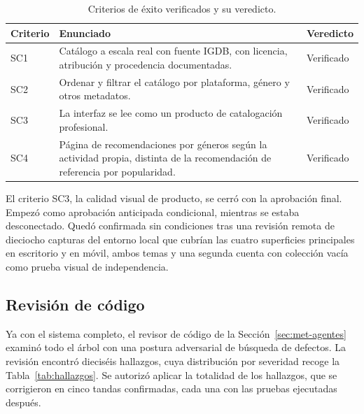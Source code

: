 \begin{table}[htp]
\centering
\begin{tabularx}{\textwidth}{ | C{0.12\textwidth} | Y | C{0.19\textwidth} | }
    \hline
    \textbf{Criterio} & \textbf{Enunciado} & \textbf{Veredicto} \\
    \hline
    SC1 & Catálogo a escala real con fuente IGDB, con licencia, atribución y procedencia documentadas. & Verificado \\
    \hline
    SC2 & Ordenar y filtrar el catálogo por plataforma, género y otros metadatos. & Verificado \\
    \hline
    SC3 & La interfaz se lee como un producto de catalogación profesional. & Verificado \\
    \hline
    SC4 & Página de recomendaciones por géneros según la actividad propia, distinta de la recomendación de referencia por popularidad. & Verificado \\
    \hline
\end{tabularx}
\caption{Criterios de éxito verificados y su veredicto.}
\label{tab:criterios}
\end{table}

El criterio SC3, la calidad visual de producto, se cerró con la aprobación final. Empezó
como aprobación anticipada condicional, mientras se estaba desconectado. Quedó
confirmada sin condiciones tras una revisión remota de dieciocho capturas del entorno local
que cubrían las cuatro superficies principales en escritorio y en móvil, ambos temas y una
segunda cuenta con colección vacía como prueba visual de independencia.

\subsection{Revisión de código}\label{sec:pru-revision}\label{sec:pru-post-cierre}\label{sec:pru-lectura}

Ya con el sistema completo, el revisor de código de la Sección~\ref{sec:met-agentes} examinó
todo el árbol con una postura adversarial de búsqueda de defectos.
La revisión encontró dieciséis hallazgos, cuya distribución por severidad recoge la
Tabla~\ref{tab:hallazgos}. Se autorizó aplicar la totalidad de los hallazgos, que se
corrigieron en cinco tandas confirmadas, cada una con las pruebas ejecutadas después.

